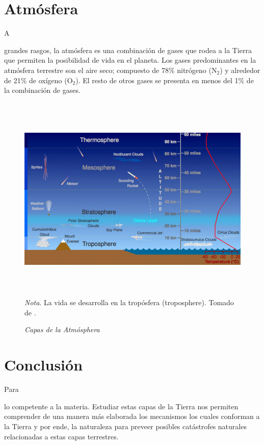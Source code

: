 \documentclass[stu, 12pt, letterpaper, donotrepeattitle, floatsintext, natbib]{apa7}
\newcommand*\chem[1]{\ensuremath{\mathrm{#1}}}
\begin{document}
\section{Atmósfera}
A \begin{justifying}
    grandes rasgos, la atmósfera es una combinación de gases que rodea a la Tierra que permiten la posibilidad de vida en el planeta.
    Los gases predominantes en la atmósfera terrestre son el aire seco; compuesto de 78\% nitrógeno (\chem{N_2}) y alrededor de 21\% de oxígeno (\chem{O_2}).
    El resto de otros gases se presenta en menos del 1\% de la combinación de gases. \citep{unknown-author-no-dateB}\par %
\end{justifying}
\vspace{\baselineskip}
\begin{figure}[H]
    \caption{\emph{Capas de la Atmósphera}}
    \centering
    \includegraphics[width=14cm,height=10cm]{atmosphere.jpg}
    \bigskip
    \\\small\textit{Nota}. La vida se desarrolla en la tropósfera (troposphere). Tomado de \cite{russell-no-date}. %
\end{figure}
\section*{Conclusión}
Para \begin{justifying}
    lo competente a la materia. Estudiar estas capas de la Tierra nos permiten comprender de una manera más elaborada los mecanismos los cuales
    conforman a la Tierra y por ende, la naturaleza para preveer posibles catástrofes naturales relacionadas a estas capas terrestres.\par
\end{justifying}

\newpage
\setcounter{secnumdepth}{0} %
\renewcommand\refname{\textbf{Referencias}}

\end{document}
